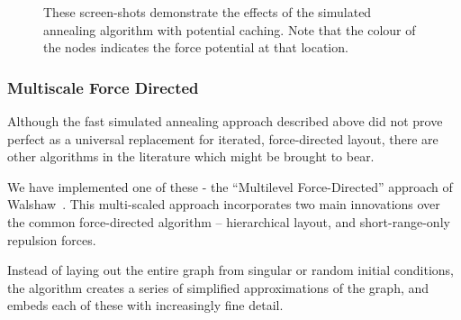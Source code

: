 \documentclass[runningheads]{cl2emult}
\begin{document}
\begin{figure}[h]
  \centering
  \caption{These screen-shots demonstrate the effects of the simulated
  annealing algorithm with potential caching.  Note that the colour of
  the nodes indicates the force potential at that location.}
  \label{fig-fastlayout}
\end{figure}


\subsubsection{Multiscale Force Directed}

Although the fast simulated annealing approach described above did not prove
perfect as a universal replacement for iterated, force-directed layout, there
are other algorithms in the literature which might be brought to bear.

We have implemented one of these - the ``Multilevel Force-Directed'' approach
of Walshaw~\cite{walshaw00multilevel}.  This multi-scaled approach
incorporates two main innovations over the common force-directed
algorithm -- hierarchical layout, and short-range-only repulsion forces.

Instead of laying out the entire graph from singular or random initial
conditions, the algorithm creates a series of simplified approximations of
the graph, and embeds each of these with increasingly fine detail.
\end{document}
